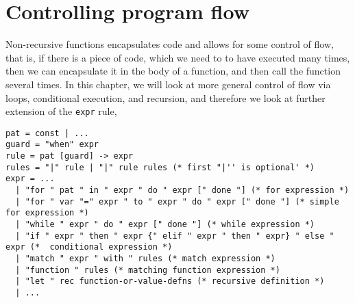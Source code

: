 \chapter{Controlling program flow}
\label{chap:flow}
Non-recursive functions encapsulates code and allows for some control of flow, that is, if there is a piece of code, which we need to to have executed many times, then we can encapsulate it in the body of a function, and then call the function several times. In this chapter, we will look at more general control of flow via loops, conditional execution, and recursion, and therefore we look at further extension of the \lstinline[language=ebnf]!expr! rule,
\begin{lstlisting}[language=ebnf]
pat = const | ...
guard = "when" expr
rule = pat [guard] -> expr
rules = "|" rule | "|" rule rules (* first "|'' is optional' *)
expr = ... 
  | "for " pat " in " expr " do " expr [" done "] (* for expression *)
  | "for " var "=" expr " to " expr " do " expr [" done "] (* simple for expression *)
  | "while " expr " do " expr [" done "] (* while expression *)
  | "if " expr " then " expr {" elif " expr " then " expr} " else " expr (*  conditional expression *)
  | "match " expr " with " rules (* match expression *)
  | "function " rules (* matching function expression *)
  | "let " rec function-or-value-defns (* recursive definition *)
  | ...
\end{lstlisting}

